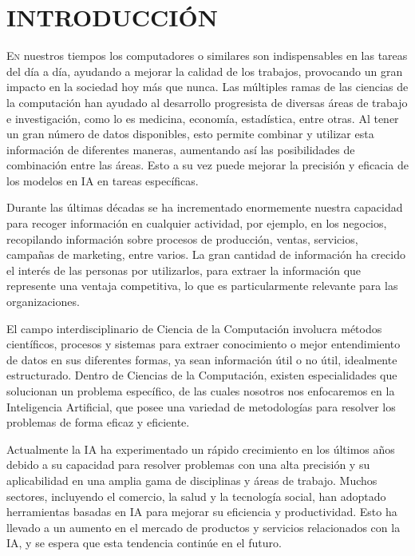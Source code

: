 \doublespacing
\chapter{INTRODUCCIÓN}
\lettrine[lines=4, slope=0.1em, findent=0.2em, nindent=0.6em]{E}{n} nuestros tiempos los computadores o similares son indispensables en las tareas del día a día, ayudando a mejorar la calidad de los trabajos, provocando un gran impacto en la sociedad hoy más que nunca. Las múltiples ramas de las ciencias de la computación han ayudado al desarrollo progresista de diversas áreas de trabajo e investigación, como lo es medicina, economía, estadística, entre otras. Al tener un gran número de datos disponibles, esto permite combinar y utilizar esta información de diferentes maneras, aumentando así las posibilidades de combinación entre las áreas. Esto a su vez puede mejorar la precisión y eficacia de los modelos en IA en tareas específicas.\\
\par Durante las últimas décadas se ha incrementado enormemente nuestra capacidad para recoger información en cualquier actividad, por ejemplo, en los negocios, recopilando información sobre procesos de producción, ventas, servicios, campañas de marketing, entre varios. La gran cantidad de información ha crecido el interés de las personas por utilizarlos, para extraer la información que represente una ventaja competitiva, lo que es particularmente relevante para las organizaciones.\\ 
\par El campo interdisciplinario de Ciencia de la Computación involucra métodos científicos, procesos y sistemas para extraer conocimiento o mejor entendimiento de datos en sus diferentes formas, ya sean información útil o no útil, idealmente estructurado. Dentro de Ciencias de la Computación, existen especialidades que solucionan un problema específico, de las cuales nosotros nos enfocaremos en la Inteligencia Artificial, que posee una variedad de metodologías para resolver los problemas de forma eficaz y eficiente. \\
\par Actualmente la IA ha experimentado un rápido crecimiento en los últimos años debido a su capacidad para resolver problemas con una alta precisión y su aplicabilidad en una amplia gama de disciplinas y áreas de trabajo. Muchos sectores, incluyendo el comercio, la salud y la tecnología social, han adoptado herramientas basadas en IA para mejorar su eficiencia y productividad. Esto ha llevado a un aumento en el mercado de productos y servicios relacionados con la IA, y se espera que esta tendencia continúe en el futuro.\\
